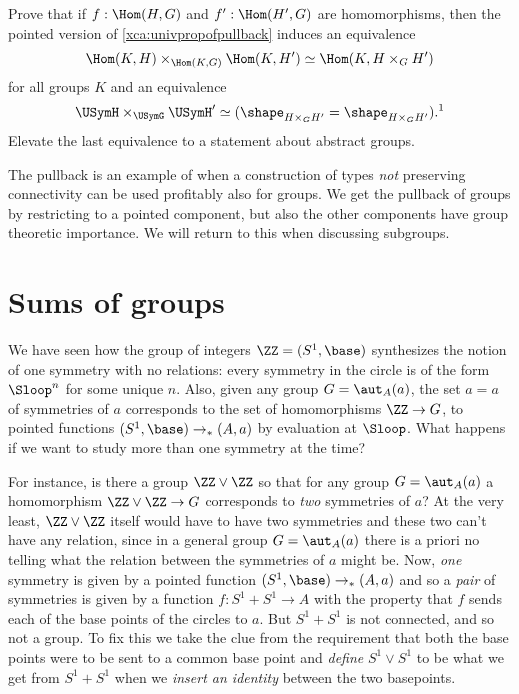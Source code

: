 \begin{xca}
  Prove that if $f:\Hom(H,G)$ and $f':\Hom(H',G)$ are homomorphisms,
  then the pointed version of \cref{xca:univpropofpullback} induces an equivalence
  $$
  \Hom(K,H)\times_{\Hom(K,G)}\Hom(K,H')\simeq \Hom(K,H\times_GH')
  $$
  for all groups $K$ and an equivalence
  \[
    \USymH \times_{\USymG} \USymH'
    \simeq (\shape_{H\times_GH'}=\shape_{H\times_GH'}).\text{\footnotemark}
  \]
  Elevate the last equivalence to a statement about abstract groups.
\end{xca}

\begin{remark}
  The pullback is an example of when a construction of types \emph{not} preserving connectivity can be used profitably also for groups.
  We get the pullback of groups by restricting to a pointed component, but also the other components have group theoretic importance.
  We will return to this when discussing subgroups.
\end{remark}



\section{Sums of groups}
\label{sec:coprod}
We have seen how the group of integers $\ZZ=(S^1,\base)$ synthesizes the notion of one symmetry with no relations: every symmetry in the circle is of the form $\Sloop^n$ for some unique $n$.  Also, given any group $G=\aut_A(a)$, the set $a=a$ of symmetries of $a$ corresponds to the set of homomorphisms $\ZZ\to G$, \ie to pointed functions $(S^1,\base)\to_*(A,a)$ by evaluation at $\Sloop$.  What happens if we want to study more than one symmetry at the time?

For instance, is there a group $\ZZ\vee\ZZ$ so that for any group $G=\aut_A(a)$ a homomorphism $\ZZ\vee\ZZ\to G$ corresponds to \emph{two} symmetries of $a$?
At the very least, $\ZZ\vee\ZZ$ itself would have to have two symmetries and these two can't have any relation, since in a general group $G=\aut_A(a)$ there is a priori no telling what the relation between the symmetries of $a$ might be.
Now, \emph{one} symmetry is given by a pointed function $(S^1,\base)\to_*(A,a)$ and so a \emph{pair} of symmetries is given by a function $f:S^1+S^1\to A$ with the property that $f$ sends each of the base points of the circles to $a$.  But $S^1+S^1$ is not connected, and so not a group.  To fix this we take the clue from the requirement that both the base points were to be sent to a common base point and \emph{define} $S^1\vee S^1$ to be what we get from $S^1+S^1$ when we \emph{insert an identity} between the two basepoints.

